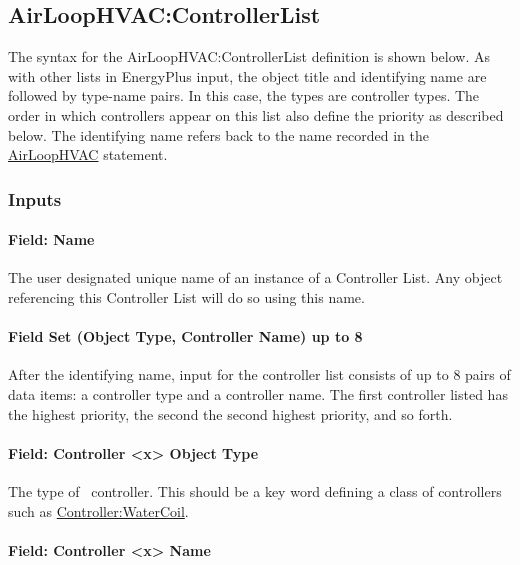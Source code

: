 \subsection{AirLoopHVAC:ControllerList}\label{airloophvaccontrollerlist}

The syntax for the AirLoopHVAC:ControllerList definition is shown below. As with other lists in EnergyPlus input, the object title and identifying name are followed by type-name pairs. In this case, the types are controller types. The order in which controllers appear on this list also define the priority as described below. The identifying name refers back to the name recorded in the \hyperref[airloophvac]{AirLoopHVAC} statement.

\subsubsection{Inputs}\label{inputs-1-002}

\paragraph{Field: Name}\label{field-name-1-001}

The user designated unique name of an instance of a Controller List. Any object referencing this Controller List will do so using this name.

\paragraph{Field Set (Object Type, Controller Name) up to 8}\label{field-set-object-type-controller-name-up-to-8}

After the identifying name, input for the controller list consists of up to 8 pairs of data items: a controller type and a controller name. The first controller listed has the highest priority, the second the second highest priority, and so forth.

\paragraph{Field: Controller \textless{}x\textgreater{} Object Type}\label{field-controller-x-object-type}

The type of~ controller. This should be a key word defining a class of controllers such as \hyperref[controllerwatercoil]{Controller:WaterCoil}.

\paragraph{Field: Controller \textless{}x\textgreater{} Name}\label{field-controller-x-name}


